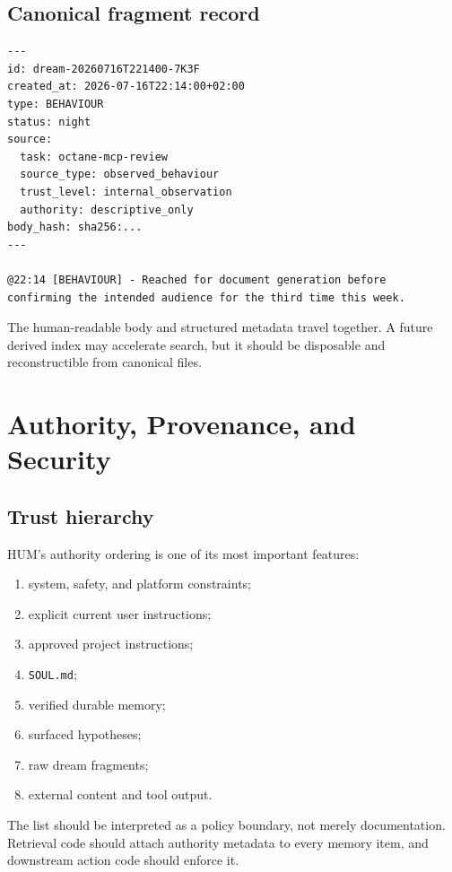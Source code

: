 \documentclass[11pt,a4paper]{article}
\begin{document}
\subsection{Canonical fragment record}

\begin{lstlisting}[language={},caption={Illustrative fragment record.}]
---
id: dream-20260716T221400-7K3F
created_at: 2026-07-16T22:14:00+02:00
type: BEHAVIOUR
status: night
source:
  task: octane-mcp-review
  source_type: observed_behaviour
  trust_level: internal_observation
  authority: descriptive_only
body_hash: sha256:...
---

@22:14 [BEHAVIOUR] - Reached for document generation before
confirming the intended audience for the third time this week.
\end{lstlisting}

The human-readable body and structured metadata travel together. A future derived index may accelerate search, but it should be disposable and reconstructible from canonical files.

\section{Authority, Provenance, and Security}

\subsection{Trust hierarchy}

HUM's authority ordering is one of its most important features:

\begin{enumerate}
  \item system, safety, and platform constraints;
  \item explicit current user instructions;
  \item approved project instructions;
  \item \texttt{SOUL.md};
  \item verified durable memory;
  \item surfaced hypotheses;
  \item raw dream fragments;
  \item external content and tool output.
\end{enumerate}

The list should be interpreted as a policy boundary, not merely documentation. Retrieval code should attach authority metadata to every memory item, and downstream action code should enforce it.
\end{document}
